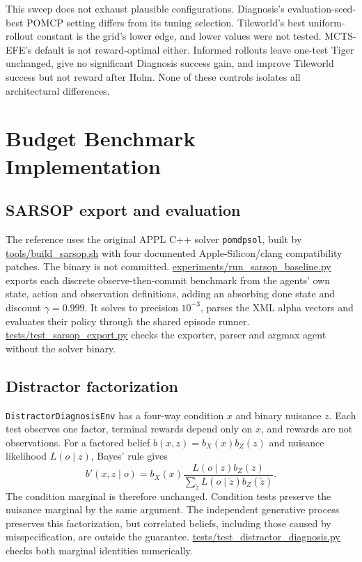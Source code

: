 \documentclass[runningheads]{llncs}
\begin{document}
This sweep does not exhaust plausible configurations. Diagnosis's evaluation-seed-best POMCP setting differs from its tuning selection. Tileworld's best uniform-rollout constant is the grid's lower edge, and lower values were not tested. MCTS-EFE's default is not reward-optimal either. Informed rollouts leave one-test Tiger unchanged, give no significant Diagnosis success gain, and improve Tileworld success but not reward after Holm. None of these controls isolates all architectural differences.

\FloatBarrier

\section{Budget Benchmark Implementation}
\label{app:budget_supp}

\subsection{SARSOP export and evaluation}
\label{app:sarsop_build}

The reference uses the original APPL C++ solver \texttt{pomdpsol}, built by \url{tools/build_sarsop.sh} with four documented Apple-Silicon/clang compatibility patches. The binary is not committed. \url{experiments/run_sarsop_baseline.py} exports each discrete observe-then-commit benchmark from the agents' own state, action and observation definitions, adding an absorbing done state and discount $\gamma=0.999$. It solves to precision $10^{-3}$, parses the XML alpha vectors and evaluates their policy through the shared episode runner. \url{tests/test_sarsop_export.py} checks the exporter, parser and argmax agent without the solver binary.

\subsection{Distractor factorization}
\label{app:distractor}

\texttt{DistractorDiagnosisEnv} has a four-way condition $x$ and binary nuisance $z$. Each test observes one factor, terminal rewards depend only on $x$, and rewards are not observations. For a factored belief $b(x,z)=b_X(x)b_Z(z)$ and nuisance likelihood $L(o\mid z)$, Bayes' rule gives
\[
b'(x,z\mid o)=b_X(x)\frac{L(o\mid z)b_Z(z)}{\sum_{\tilde z}L(o\mid\tilde z)b_Z(\tilde z)}.
\]
The condition marginal is therefore unchanged. Condition tests preserve the nuisance marginal by the same argument. The independent generative process preserves this factorization, but correlated beliefs, including those caused by misspecification, are outside the guarantee. \url{tests/test_distractor_diagnosis.py} checks both marginal identities numerically.
\end{document}
